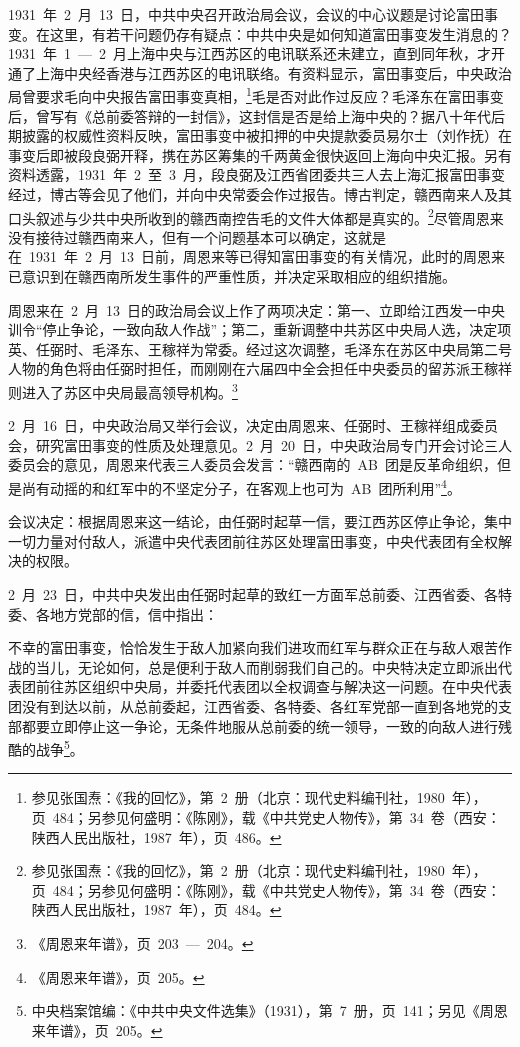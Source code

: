 1931~年~2~月~13~日，中共中央召开政治局会议，会议的中心议题是讨论富田事变。在这里，有若干问题仍存有疑点：中共中央是如何知道富田事变发生消息的？1931~年~1~—~2~月上海中央与江西苏区的电讯联系还未建立，直到同年秋，才开通了上海中央经香港与江西苏区的电讯联络。有资料显示，富田事变后，中央政治局曾要求毛向中央报告富田事变真相，\footnote{参见张国焘：《我的回忆》，第~2~册（北京：现代史料编刊社，1980~年），页~484；另参见何盛明：《陈刚》，载《中共党史人物传》，第~34~卷（西安：陕西人民出版社，1987~年），页~486。}毛是否对此作过反应？毛泽东在富田事变后，曾写有《总前委答辩的一封信》，这封信是否是给上海中央的？据八十年代后期披露的权威性资料反映，富田事变中被扣押的中央提款委员易尔士（刘作抚）在事变后即被段良弼开释，携在苏区筹集的千两黄金很快返回上海向中央汇报。另有资料透露，1931~年~2~至~3~月，段良弼及江西省团委共三人去上海汇报富田事变经过，博古等会见了他们，并向中央常委会作过报告。博古判定，赣西南来人及其口头叙述与少共中央所收到的赣西南控告毛的文件大体都是真实的。\footnote{参见张国焘：《我的回忆》，第~2~册（北京：现代史料编刊社，1980~年），页~484；另参见何盛明：《陈刚》，载《中共党史人物传》，第~34~卷（西安：陕西人民出版社，1987~年），页~484。}尽管周恩来没有接待过赣西南来人，但有一个问题基本可以确定，这就是在~1931~年~2~月~13~日前，周恩来等已得知富田事变的有关情况，此时的周恩来已意识到在赣西南所发生事件的严重性质，并决定采取相应的组织措施。

周恩来在~2~月~13~日的政治局会议上作了两项决定：第一、立即给江西发一中央训令“停止争论，一致向敌人作战”；第二，重新调整中共苏区中央局人选，决定项英、任弼时、毛泽东、王稼祥为常委。经过这次调整，毛泽东在苏区中央局第二号人物的角色将由任弼时担任，而刚刚在六届四中全会担任中央委员的留苏派王稼祥则进入了苏区中央局最高领导机构。\footnote{《周恩来年谱》，页~203~—~204。}

2~月~16~日，中央政治局又举行会议，决定由周恩来、任弼时、王稼祥组成委员会，研究富田事变的性质及处理意见。2~月~20~日，中央政治局专门开会讨论三人委员会的意见，周恩来代表三人委员会发言：“赣西南的~AB~团是反革命组织，但是尚有动摇的和红军中的不坚定分子，在客观上也可为~AB~团所利用”\footnote{《周恩来年谱》，页~205。}。

会议决定：根据周恩来这一结论，由任弼时起草一信，要江西苏区停止争论，集中一切力量对付敌人，派遣中央代表团前往苏区处理富田事变，中央代表团有全权解决的权限。

2~月~23~日，中共中央发出由任弼时起草的致红一方面军总前委、江西省委、各特委、各地方党部的信，信中指出：

\begin{quoting}
不幸的富田事变，恰恰发生于敌人加紧向我们进攻而红军与群众正在与敌人艰苦作战的当儿，无论如何，总是便利于敌人而削弱我们自己的。中央特决定立即派出代表团前往苏区组织中央局，并委托代表团以全权调查与解决这一问题。在中央代表团没有到达以前，从总前委起，江西省委、各特委、各红军党部一直到各地党的支部都要立即停止这一争论，无条件地服从总前委的统一领导，一致的向敌人进行残酷的战争\footnote{中央档案馆编：《中共中央文件选集》（1931），第~7~册，页~141；另见《周恩来年谱》，页~205。}。
\end{quoting}

